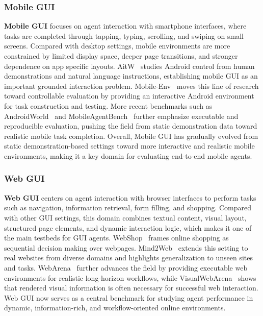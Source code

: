 \documentclass{llmxive}
\begin{document}
\subsubsection{Mobile GUI}
\label{Mobile  GUI}
\textbf{Mobile GUI} focuses on agent interaction with smartphone interfaces, where tasks are completed through tapping, typing, scrolling, and swiping on small screens. Compared with desktop settings, mobile environments are more constrained by limited display space, deeper page transitions, and stronger dependence on app specific layouts. AitW~\cite{AitW} studies Android control from human demonstrations and natural language instructions, establishing mobile GUI as an important grounded interaction problem. Mobile-Env~\cite{Mobile-Env} moves this line of research toward controllable evaluation by providing an interactive Android environment for task construction and testing. More recent benchmarks such as AndroidWorld~\cite{AndroidWorld} and MobileAgentBench~\cite{MobileAgentBench} further emphasize executable and reproducible evaluation, pushing the field from static demonstration data toward realistic mobile task completion. Overall, Mobile GUI has gradually evolved from static demonstration-based settings toward more interactive and realistic mobile environments, making it a key domain for evaluating end-to-end mobile agents.

\subsubsection{Web GUI}
\label{Web GUI}
\textbf{Web GUI} centers on agent interaction with browser interfaces to perform tasks such as navigation, information retrieval, form filling, and shopping. Compared with other GUI settings, this domain combines textual content, visual layout, structured page elements, and dynamic interaction logic, which makes it one of the main testbeds for GUI agents. WebShop~\cite{WebShop} frames online shopping as sequential decision making over webpages. Mind2Web~\cite{Mind2Web} extends this setting to real websites from diverse domains and highlights generalization to unseen sites and tasks. WebArena~\cite{WebArena} further advances the field by providing executable web environments for realistic long-horizon workflows, while VisualWebArena~\cite{VisualWebArena} shows that rendered visual information is often necessary for successful web interaction. Web GUI now serves as a central benchmark for studying agent performance in dynamic, information-rich, and workflow-oriented online environments.
\end{document}
